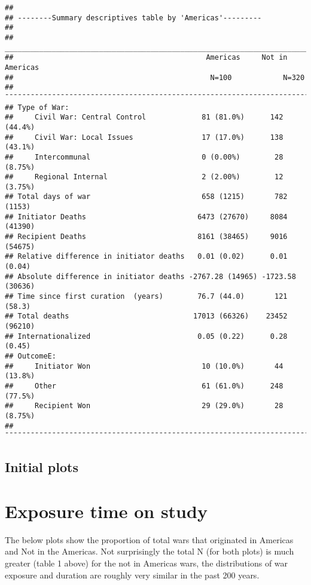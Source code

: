 \documentclass[
]{article}
\begin{document}
\begin{verbatim}
## 
## --------Summary descriptives table by 'Americas'---------
## 
## _________________________________________________________________________ 
##                                             Americas     Not in Americas  
##                                              N=100            N=320       
## ¯¯¯¯¯¯¯¯¯¯¯¯¯¯¯¯¯¯¯¯¯¯¯¯¯¯¯¯¯¯¯¯¯¯¯¯¯¯¯¯¯¯¯¯¯¯¯¯¯¯¯¯¯¯¯¯¯¯¯¯¯¯¯¯¯¯¯¯¯¯¯¯¯ 
## Type of War:                                                              
##     Civil War: Central Control             81 (81.0%)      142 (44.4%)    
##     Civil War: Local Issues                17 (17.0%)      138 (43.1%)    
##     Intercommunal                          0 (0.00%)        28 (8.75%)    
##     Regional Internal                      2 (2.00%)        12 (3.75%)    
## Total days of war                          658 (1215)       782 (1153)    
## Initiator Deaths                          6473 (27670)     8084 (41390)   
## Recipient Deaths                          8161 (38465)     9016 (54675)   
## Relative difference in initiator deaths   0.01 (0.02)      0.01 (0.04)    
## Absolute difference in initiator deaths -2767.28 (14965) -1723.58 (30636) 
## Time since first curation  (years)        76.7 (44.0)       121 (58.3)    
## Total deaths                             17013 (66326)    23452 (96210)   
## Internationalized                         0.05 (0.22)      0.28 (0.45)    
## OutcomeE:                                                                 
##     Initiator Won                          10 (10.0%)       44 (13.8%)    
##     Other                                  61 (61.0%)      248 (77.5%)    
##     Recipient Won                          29 (29.0%)       28 (8.75%)    
## ¯¯¯¯¯¯¯¯¯¯¯¯¯¯¯¯¯¯¯¯¯¯¯¯¯¯¯¯¯¯¯¯¯¯¯¯¯¯¯¯¯¯¯¯¯¯¯¯¯¯¯¯¯¯¯¯¯¯¯¯¯¯¯¯¯¯¯¯¯¯¯¯¯
\end{verbatim}

\hypertarget{initial-plots}{%
\subsection{Initial plots}\label{initial-plots}}

\hypertarget{exposure-time-on-study}{%
\section{Exposure time on study}\label{exposure-time-on-study}}

The below plots show the proportion of total wars that originated in
Americas and Not in the Americas. Not surprisingly the total N (for both
plots) is much greater (table 1 above) for the not in Americas wars, the
distributions of war exposure and duration are roughly very similar in
the past 200 years.
\end{document}
